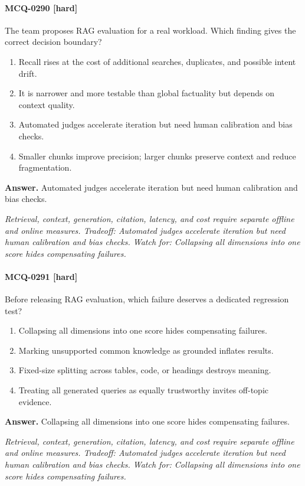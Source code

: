 \paragraph{MCQ-0290 [hard]} The team proposes RAG evaluation for a real workload. Which finding gives the correct decision boundary?
\begin{enumerate}[label=\Alph*.]
\item Recall rises at the cost of additional searches, duplicates, and possible intent drift.
\item It is narrower and more testable than global factuality but depends on context quality.
\item Automated judges accelerate iteration but need human calibration and bias checks.
\item Smaller chunks improve precision; larger chunks preserve context and reduce fragmentation.
\end{enumerate}
\noindent\textbf{Answer.} Automated judges accelerate iteration but need human calibration and bias checks.
\par\textit{Retrieval, context, generation, citation, latency, and cost require separate offline and online measures. Tradeoff: Automated judges accelerate iteration but need human calibration and bias checks. Watch for: Collapsing all dimensions into one score hides compensating failures.}
\paragraph{MCQ-0291 [hard]} Before releasing RAG evaluation, which failure deserves a dedicated regression test?
\begin{enumerate}[label=\Alph*.]
\item Collapsing all dimensions into one score hides compensating failures.
\item Marking unsupported common knowledge as grounded inflates results.
\item Fixed-size splitting across tables, code, or headings destroys meaning.
\item Treating all generated queries as equally trustworthy invites off-topic evidence.
\end{enumerate}
\noindent\textbf{Answer.} Collapsing all dimensions into one score hides compensating failures.
\par\textit{Retrieval, context, generation, citation, latency, and cost require separate offline and online measures. Tradeoff: Automated judges accelerate iteration but need human calibration and bias checks. Watch for: Collapsing all dimensions into one score hides compensating failures.}
